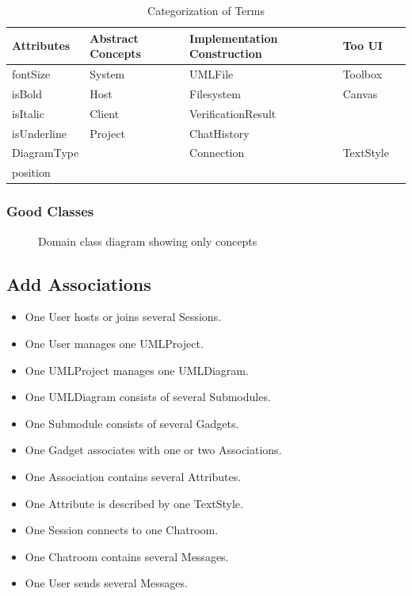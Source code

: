 \documentclass[12pt]{article}
\begin{document}
    \begin{table}[h]
        \centering
        \caption{Categorization of Terms}
        \begin{tabular}{l l l ll}
            \toprule
            \textbf{Attributes} & \textbf{Abstract Concepts} & \textbf{Implementation Construction}  & \textbf{Too UI}\\
            \midrule
            fontSize & System & UMLFile & Toolbox \\
            isBold & Host & Filesystem & Canvas \\
            isItalic & Client & VerificationResult & \\
            isUnderline & Project & ChatHistory & \\
            DiagramType & & Connection & TextStyle & \\
            position    & &            &           & \\
            \bottomrule
        \end{tabular}
        \label{tab:categories}
    \end{table}

    \subsubsection{Good Classes}

    \begin{figure}[H]
        \centering
        
        \caption{Domain class diagram showing only concepts}
        \label{fig:dm}
    \end{figure}

    \subsection{Add Associations}
    \begin{itemize}
        \item One User hosts or joins several Sessions.
        \item One User manages one UMLProject.
        \item One UMLProject manages one UMLDiagram.
        \item One UMLDiagram consists of several Submodules.
        \item One Submodule consists of several Gadgets.
        \item One Gadget associates with one or two Associations.
        \item One Association contains several Attributes.
        \item One Attribute is described by one TextStyle.
        \item One Session connects to one Chatroom.
        \item One Chatroom contains several Messages.
        \item One User sends several Messages.
    \end{itemize}
\end{document}
